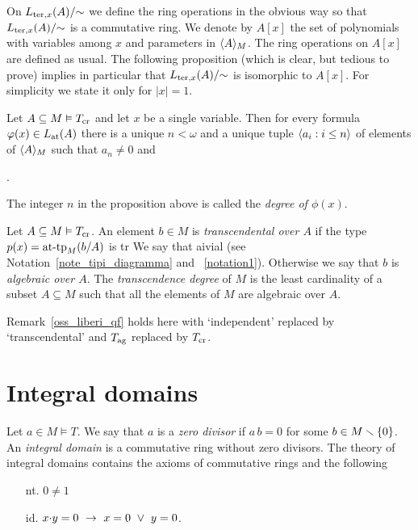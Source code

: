 On $L_{{\rm ter},x}(A)/\mathord{\sim}$ we define the ring operations in the obvious way so that $L_{{\rm ter},x}(A)/\mathord{\sim}$ is a commutative ring.
%
We denote by $A[x]$ the set of polynomials with variables among $x$ and parameters in $\<A\>_M$.
%
The ring operations on $A[x]$ are defined as usual.
%
The following proposition (which is clear, but tedious to prove) implies in particular that $L_{{\rm ter},x}(A)/\mathord{\sim}$ is isomorphic to $A[x]$.
%
For simplicity we state it only for $|x|=1$.

\begin{proposition}
\label{prop_formacanonicaterminiau}
Let  $A\subseteq M\models T_{\rm cr}$ and let $x$ be a single variable.
%
Then for every formula $\phi(x)\in L_{\rm at}(A)$ there is a unique $n<\omega$ and a unique tuple $\<a_i:i\le n\>$ of elements of $\<A\>_M$ such that $a_n\neq0$ and 

.
\end{proposition}

The integer $n$ in the proposition above is called the \emph{degree of $\phi(x)$}.

\begin{definition}\label{def_id_trans_alg}
   Let $A\subseteq M\models T_{\rm cr}$.
%
 An element $b\in M$ is \emph{transcendental over $A$\/} if the type $p(x)=\attp_M(b/A)$ is tr We say that aivial (see Notation~\ref{note_tipi_diagramma} and ~\ref{notation1}).
%
  Otherwise we say that $b$ is \emph{algebraic over $A$}.
%
  The \emph{transcendence degree\/} of $M$ is the least cardinality of a subset $A\subseteq M$ such that all the elements of $M$ are algebraic over $A$.
\end{definition}  

\begin{remark}\label{oss_liberi_cr}
Remark~\ref{oss_liberi_qf} holds here with `independent' replaced by `transcendental' and $T_{\rm ag}$ replaced by $T_{\rm cr}$.
\end{remark}

\section{Integral domains}

Let $a\in M\models T$.
%
We say that $a$ is a \emph{zero divisor} if $a\,b=0$ for some $b\in M\sm\{0\}$.
%
An \emph{integral domain\/} is a commutative ring without zero divisors.
%
The theory of integral domains contains the axioms of commutative rings and the following
\begin{itemize}
\item[nt.] $0\neq 1$
\item[id.] $x\mdot y =0\ \imp\ x=0\ \vee\ y=0$.
\end{itemize}

